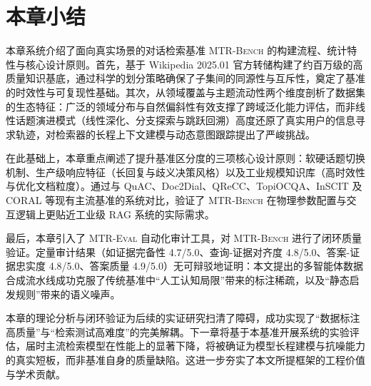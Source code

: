 


\section{本章小结}
\label{sec:chapter6_summary}

本章系统介绍了面向真实场景的对话检索基准 \textsc{MTR-Bench} 的构建流程、统计特性与核心设计原则。首先，基于 Wikipedia 2025.01 官方转储构建了约百万级的高质量知识基底，通过科学的划分策略确保了子集间的同源性与互斥性，奠定了基准的时效性与可复现性基础。其次，从领域覆盖与主题流动性两个维度剖析了数据集的生态特征：广泛的领域分布与自然偏斜性有效支撑了跨域泛化能力评估，而非线性话题演进模式（线性深化、分支探索与跳跃回溯）高度还原了真实用户的信息寻求轨迹，对检索器的长程上下文建模与动态意图跟踪提出了严峻挑战。

在此基础上，本章重点阐述了提升基准区分度的三项核心设计原则：软硬话题切换机制、生产级响应特征（长回复与歧义决策风格）以及工业规模知识库（高时效性与优化文档粒度）。通过与 QuAC、Doc2Dial、QReCC、TopiOCQA、InSCIT 及 CORAL 等现有主流基准的系统对比，验证了 \textsc{MTR-Bench} 在物理参数配置与交互逻辑上更贴近工业级 RAG 系统的实际需求。

最后，本章引入了 \textsc{MTR-Eval} 自动化审计工具，对 \textsc{MTR-Bench} 进行了闭环质量验证。定量审计结果（如证据完备性 4.7/5.0、查询-证据对齐度 4.8/5.0、答案-证据忠实度 4.8/5.0、答案质量 4.9/5.0）无可辩驳地证明：本文提出的多智能体数据合成流水线成功克服了传统基准中“人工认知局限”带来的标注稀疏，以及“静态启发规则”带来的语义噪声。

本章的理论分析与闭环验证为后续的实证研究扫清了障碍，成功实现了“数据标注高质量”与“检索测试高难度”的完美解耦。下一章将基于本基准开展系统的实验评估，届时主流检索模型在性能上的显著下降，将被确证为模型长程建模与抗噪能力的真实短板，而非基准自身的质量缺陷。这进一步夯实了本文所提框架的工程价值与学术贡献。
